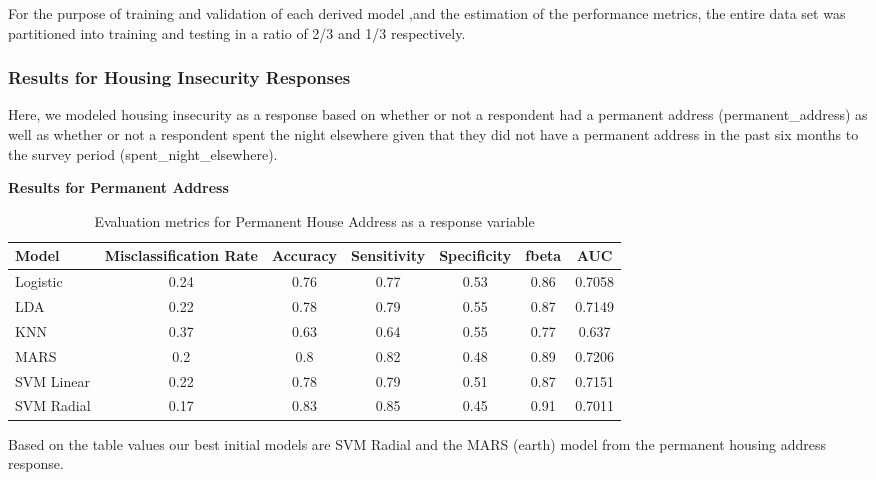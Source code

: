 \documentclass[
  10pt,
]{article}
\begin{document}
For the purpose of training and validation of each derived model ,and the estimation of the performance metrics, the entire data set was partitioned into training and testing in a ratio of 2/3 and 1/3 respectively.

\hypertarget{results-for-housing-insecurity-responses}{%
\subsubsection{Results for Housing Insecurity Responses}\label{results-for-housing-insecurity-responses}}

Here, we modeled housing insecurity as a response based on whether or not a respondent had a permanent address (permanent\_address) as well as whether or not a respondent spent the night elsewhere given that they did not have a permanent address in the past six months to the survey period (spent\_night\_elsewhere).

\textbf{Results for Permanent Address}

\begin{table}[H]

\caption{\label{tab:unnamed-chunk-9}Evaluation metrics for Permanent House Address  as a response variable}
\centering
\fontsize{12}{14}\selectfont
\begin{tabular}[t]{lcccccc}
\toprule
Model & Misclassification Rate & Accuracy & Sensitivity & Specificity & fbeta & AUC\\
\midrule
Logistic & 0.24 & 0.76 & 0.77 & 0.53 & 0.86 & 0.7058\\
LDA & 0.22 & 0.78 & 0.79 & 0.55 & 0.87 & 0.7149\\
KNN & 0.37 & 0.63 & 0.64 & 0.55 & 0.77 & 0.637\\
MARS & 0.2 & 0.8 & 0.82 & 0.48 & 0.89 & 0.7206\\
SVM Linear & 0.22 & 0.78 & 0.79 & 0.51 & 0.87 & 0.7151\\
SVM Radial & 0.17 & 0.83 & 0.85 & 0.45 & 0.91 & 0.7011\\
\bottomrule
\end{tabular}
\end{table}

Based on the table values our best initial models are SVM Radial and the MARS (earth) model from the permanent housing address response.\\
\end{document}
